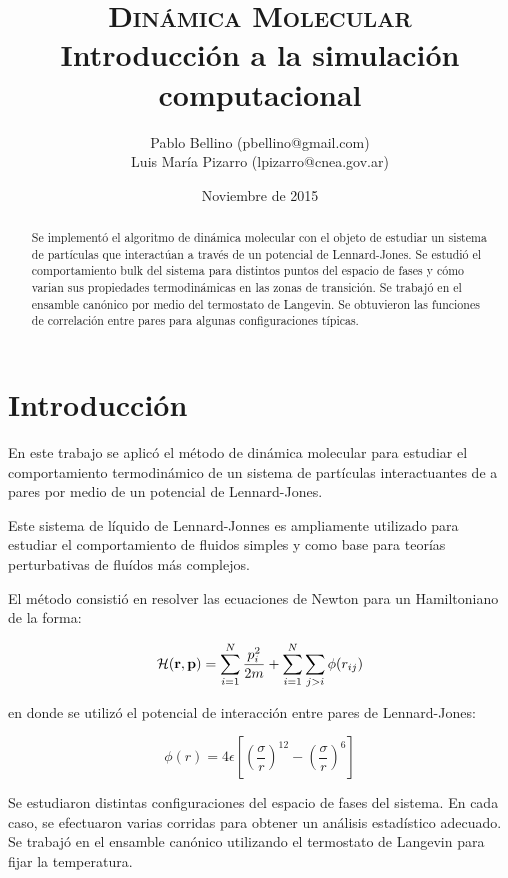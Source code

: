 \documentclass[a4paper,12pt]{article}
\title{\textsc{Dinámica Molecular} \\ \vspace{2em} \Large{Introducción a la 
simulación computacional}}
\author{\small{ Pablo Bellino (pbellino@gmail.com)} \\
        \small{Luis María Pizarro (lpizarro@cnea.gov.ar)}}
\date{Noviembre de 2015}
\begin{document}

\maketitle

\begin{abstract}
Se implementó el algoritmo de dinámica molecular con el objeto de estudiar un 
sistema de partículas que interactúan a través de un potencial de 
Lennard-Jones. Se estudió el comportamiento bulk del sistema para distintos 
puntos del espacio de fases y cómo varian sus propiedades termodinámicas en las 
zonas de transición. Se trabajó en el ensamble canónico por medio del 
termostato de Langevin. Se obtuvieron las funciones de correlación entre 
pares para algunas configuraciones típicas.
\end{abstract}


\section{Introducción}

En este trabajo se aplicó el método de dinámica molecular para estudiar el 
comportamiento termodinámico de un sistema de partículas interactuantes de a 
pares por medio de un potencial de Lennard-Jones.

Este sistema de líquido de Lennard-Jonnes es ampliamente utilizado para 
estudiar el comportamiento de fluidos simples y como base para teorías 
perturbativas de fluídos más complejos.

El método consistió en resolver las ecuaciones de Newton para un Hamiltoniano 
de la forma:

\begin{equation}\label{eq:hamiltoniano}
  \mathcal H({\bf r},{\bf p}) = \sum_{i=1}^{N} \frac{p_i^2}{2m} + \sum_{i=1}^N \sum_{j>i} \phi (r_{ij})
\end{equation}

\noindent en donde se utilizó el potencial de interacción entre pares de 
Lennard-Jones:

\begin{equation}\label{eq:pot_LJ}
  \phi (r) = 4\epsilon\left[\left(\frac{\sigma}{r}\right)^{12} -\left(\frac{\sigma}{r}\right)^{6}\right]
\end{equation}

Se estudiaron distintas configuraciones del espacio de fases del sistema. En 
cada caso, se efectuaron varias corridas para obtener un análisis estadístico 
adecuado. Se trabajó en el ensamble canónico utilizando el termostato de 
Langevin para fijar la temperatura. 
\end{document}
